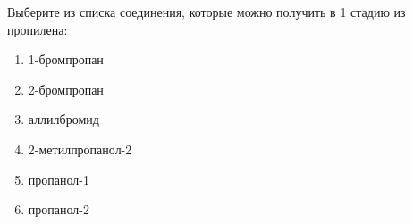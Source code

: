 
Выберите из списка
соединения, которые можно получить в 1 стадию из пропилена:

\begin{enumerate}
    \item 1-бромпропан
    \item 2-бромпропан
    \item аллилбромид
    \item 2-метилпропанол-2
    \item пропанол-1
    \item пропанол-2
\end{enumerate}



